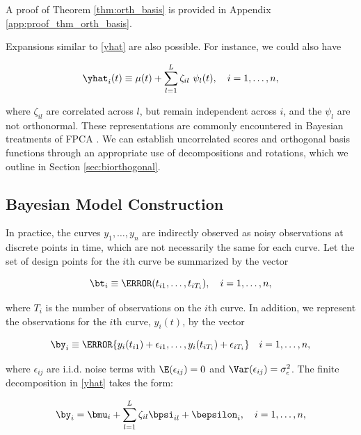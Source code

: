 \documentclass[12pt]{article}
\def\sigsqeps{\sigma^2_{\epsilon}}
\theoremstyle{plain}
\theoremstyle{definition}
\theoremstyle{remark}
\begin{document}
\noindent A proof of Theorem \ref{thm:orth_basis} is provided in Appendix \ref{app:proof_thm_orth_basis}.

Expansions similar to \eqref{yhat} are also possible. For instance, we could also have

\begin{equation}
	\yhat_i (t) \equiv \mu (t) + \sum_{l=1}^L \zeta_{il} \ \psi_l (t), \quad i = 1, \dots, n,
\label{yhat_not_orthogonal}
\end{equation}

\noindent where $\zeta_{il}$ are correlated across $l$, but remain independent across $i$, and the $\psi_l$ are not
orthonormal. These representations are commonly encountered in Bayesian treatments of FPCA \cite{vanderlinde08,
goldsmith15}. We can establish uncorrelated scores and orthogonal basis functions through an appropriate
use of decompositions and rotations, which we outline in Section \ref{sec:biorthogonal}.


\subsection{Bayesian Model Construction}
\label{sec:bayes_mod}

In practice, the curves $y_1, \dots, y_n$ are indirectly observed as noisy observations at discrete points in time,
which are not necessarily the same for each curve.
Let the set of design points for the $i$th curve be summarized by the vector

\begin{equation}
	\bt_i \equiv \T{(t_{i1}, \dots, t_{iT_i})}, \quad i = 1, \dots, n,
\label{t_i}
\end{equation}

\noindent where $T_i$ is the number of observations on the $i$th curve. In addition, we represent the
observations for the $i$th curve, $y_i (t)$, by the vector

\begin{equation}
	\by_i \equiv \T{\{ y_i (t_{i1}) + \epsilon_{i1}, \dots, y_i (t_{iT_i}) + \epsilon_{iT_i} \}} \quad i = 1, \dots, n,
\label{disc_obs}
\end{equation}

\noindent where $\epsilon_{ij}$ are i.i.d. noise terms with $\E (\epsilon_{ij}) = 0$ and $\Var (\epsilon_{ij}) = \sigsqeps$.
The finite decomposition in \eqref{yhat} takes the form:

\begin{equation}
	\by_i = \bmu_i + \sum_{l=1}^L \zeta_{il} \bpsi_{il} + \bepsilon_{i}, \quad i = 1, \dots, n,
\label{resp_mod}
\end{equation}
\end{document}
